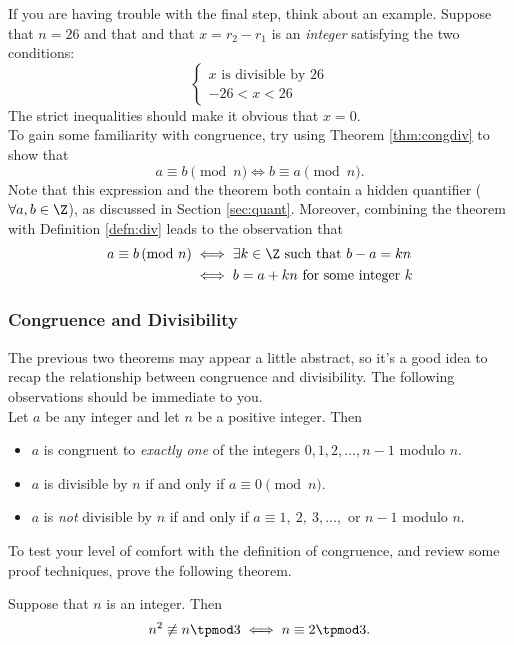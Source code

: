 \noindent If you are having trouble with the final step, think about an example. Suppose that $n=26$ and that and that $x=r_2-r_1$ is an \emph{integer} satisfying the two conditions:
\[\begin{cases}
x\text{ is divisible by }26\\
-26<x<26
\end{cases}\]
The strict inequalities should make it obvious that $x=0$.\\

\noindent To gain some familiarity with congruence, try using Theorem \ref{thm:congdiv} to show that
\[a\equiv b\pmod n\iff b\equiv a\pmod n.\]
Note that this expression and the theorem both contain a hidden quantifier ($\forall a,b\in\Z$), as discussed in Section \ref{sec:quant}. Moreover, combining the theorem with Definition \ref{defn:div} leads to the observation that
\begin{align*}
a\equiv b\negthickspace\pmod n&\iff \exists k\in\Z\text{ such that }b-a=kn\\
&\iff b=a+kn\text{ for some integer }k
\end{align*}


\subsubsection*{Congruence and Divisibility}

The previous two theorems may appear a little abstract, so it's a good idea to recap the relationship between congruence and divisibility. The following observations should be immediate to you.\\

\noindent Let $a$ be any integer and let $n$ be a positive integer. Then\\[-15pt]
\begin{itemize}\setlength{\itemsep}{0pt}
  \item $a$ is congruent to \emph{exactly one} of the integers $0,1,2,\ldots,n-1$ modulo $n$.
	\item $a$ is divisible by $n$ if and only if $a\equiv 0\pmod n$. 
	\item $a$ is \emph{not} divisible by $n$ if and only if $a\equiv 1,\ 2,\ 3,\ldots,$ or $n-1$ modulo $n$. 
\end{itemize}

\noindent To test your level of comfort with the definition of congruence, and review some proof techniques, prove the following theorem. 

\begin{thm}\label{thm:congex}
Suppose that $n$ is an integer. Then
\[n^2\not\equiv n\tpmod 3\iff n\equiv 2\tpmod 3.\]
\end{thm}

